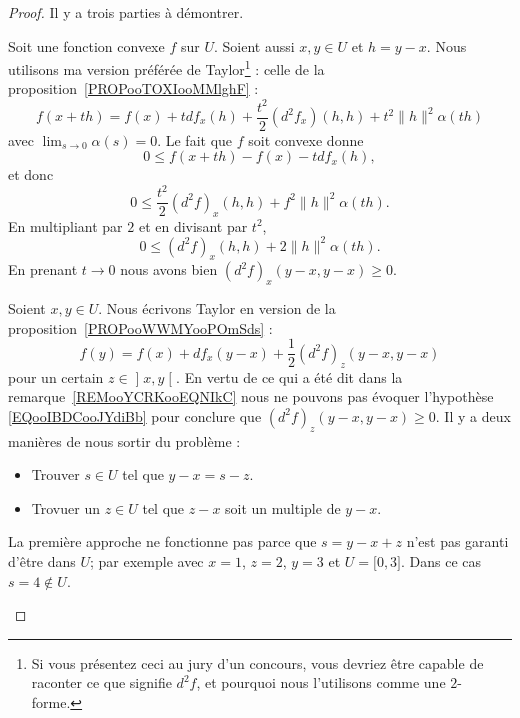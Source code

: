 \begin{proof}
	Il y a trois parties à démontrer.
	\begin{subproof}

		Soit une fonction convexe \( f\) sur \( U\). Soient aussi \( x,y\in U\) et \( h=y-x\). Nous utilisons ma version préférée de Taylor\footnote{Si vous présentez ceci au jury d'un concours, vous devriez être capable de raconter ce que signifie \( d^2f\), et pourquoi nous l'utilisons comme une \( 2\)-forme.} : celle de la proposition~\ref{PROPooTOXIooMMlghF} :
		\begin{equation}
			f(x+th)=f(x)+tdf_x(h)+\frac{ t^2 }{2}(d^2f_x)(h,h)+t^2\| h \|^2\alpha(th)
		\end{equation}
		avec \( \lim_{s\to 0}\alpha(s)=0\). Le fait que \( f\) soit convexe donne
		\begin{equation}
			0\leq f(x+th)-f(x)-tdf_x(h),
		\end{equation}
		et donc
		\begin{equation}
			0\leq \frac{ t^2 }{2}(d^2f)_x(h,h)+f^2\| h \|^2\alpha(th).
		\end{equation}
		En multipliant par \( 2\) et en divisant par \( t^2\),
		\begin{equation}
			0\leq (d^2f)_x(h,h)+2\| h \|^2\alpha(th).
		\end{equation}
		En prenant \( t\to 0\) nous avons bien  \( (d^2f)_x(y-x,y-x)\geq 0\).


		Soient \( x,y\in U\). Nous écrivons Taylor en version de la proposition~\ref{PROPooWWMYooPOmSds} :
		\begin{equation}
			f(y)=f(x)+df_x(y-x)+\frac{ 1 }{2}(d^2f)_z(y-x,y-x)
		\end{equation}
		pour un certain \( z\in\mathopen] x , y \mathclose[\). En vertu de ce qui a été dit dans la remarque~\ref{REMooYCRKooEQNIkC} nous ne pouvons pas évoquer l'hypothèse \eqref{EQooIBDCooJYdiBb} pour conclure que \( (d^2f)_z(y-x,y-x)\geq 0\). Il y a deux manières de nous sortir du problème :
		\begin{itemize}
			\item Trouver \( s\in U\) tel que \( y-x=s-z\).
			\item Trovuer un \( z\in U\) tel que \( z-x\) soit un multiple de \( y-x\).
		\end{itemize}
		La première approche ne fonctionne pas parce que \( s=y-x+z\) n'est pas garanti d'être dans \( U\); par exemple avec \( x=1\), \( z=2\), \( y=3\) et \( U=\mathopen[ 0 , 3 \mathclose]\). Dans ce cas \( s=4\notin U\).


\end{subproof}
\end{proof}
